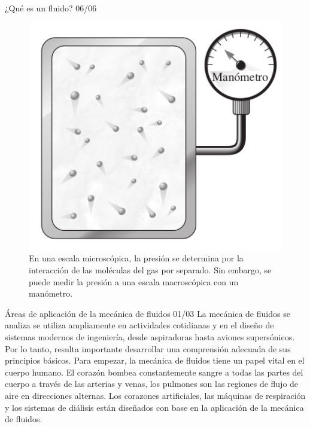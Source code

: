 \begin{frame}{¿Qué es un fluido? 06/06}
\justifying
\begin{figure}[H]
\centering
\includegraphics[scale=0.3]{Section_Files/imagenes/sec01_0101_Fig01-06.png}
\caption{En una escala microscópica, la presión se determina por la interacción de las moléculas del gas por separado. Sin embargo, se puede medir la presión a una escala macroscópica con un manómetro.}
\label{fig: Figura1-06}
\end{figure}
\end{frame}	
	
\begin{frame}{Áreas de aplicación de la mecánica de fluidos 01/03}
\justifying
La mecánica de fluidos se analiza se utiliza ampliamente en actividades cotidianas y en el diseño de sistemas modernos de ingeniería, desde aspiradoras hasta aviones supersónicos. Por lo tanto, resulta importante desarrollar una comprensión adecuada de sus principios básicos. Para empezar, la mecánica de fluidos tiene un papel vital en el cuerpo humano. El corazón bombea constantemente sangre a todas las partes del cuerpo a través de las arterias y venas, los pulmones son las regiones de flujo de aire en direcciones alternas. Los corazones artificiales, las máquinas de respiración y los sistemas de diálisis están diseñados con base en la aplicación de la mecánica de fluidos.
\end{frame}
	
